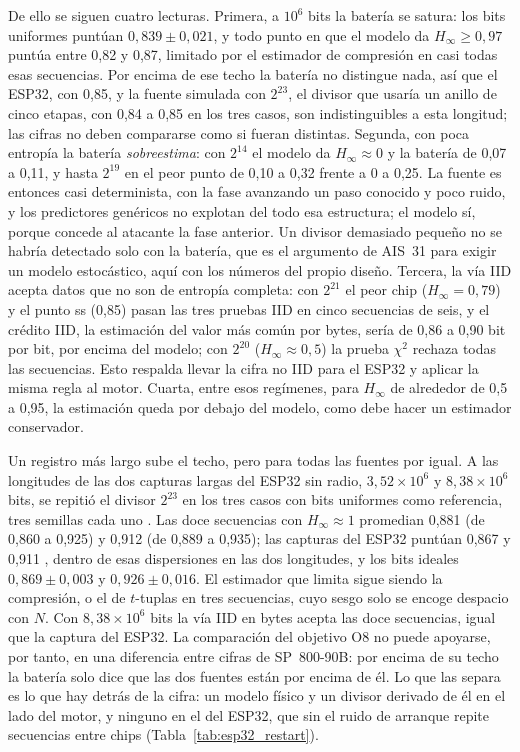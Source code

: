 De ello se siguen cuatro lecturas. Primera, a $10^6$ bits la batería se
satura: los bits uniformes puntúan $0{,}839 \pm 0{,}021$, y todo punto en
que el modelo da $H_\infty \ge 0{,}97$ puntúa entre 0,82 y 0,87, limitado
por el estimador de compresión en casi todas esas secuencias. Por encima de ese techo la
batería no distingue nada, así que el ESP32, con 0,85, y la fuente
simulada con $2^{23}$, el divisor que usaría un anillo de cinco etapas,
con 0,84 a 0,85 en los tres casos, son indistinguibles a esta longitud; las cifras no deben compararse como si
fueran distintas. Segunda, con poca entropía la batería
\emph{sobreestima}: con $2^{14}$ el modelo da $H_\infty \approx 0$ y la
batería de 0,07 a 0,11, y hasta $2^{19}$ en el peor punto de 0,10 a 0,32
frente a 0 a 0,25. La fuente es entonces casi determinista, con la fase
avanzando un paso conocido y poco ruido, y los predictores genéricos no
explotan del todo esa estructura; el modelo sí, porque concede al atacante
la fase anterior. Un divisor demasiado pequeño no se habría detectado solo
con la batería, que es el argumento de AIS~31 para exigir un modelo
estocástico, aquí con los números del propio diseño. Tercera, la vía IID
acepta datos que no son de entropía completa: con $2^{21}$ el peor chip
($H_\infty = 0{,}79$) y el punto ss (0,85) pasan las tres pruebas IID en
cinco secuencias de seis, y el crédito IID, la estimación del valor más
común por bytes, sería de 0,86 a 0,90 bit por bit, por encima del modelo;
con $2^{20}$ ($H_\infty \approx 0{,}5$) la prueba $\chi^2$ rechaza todas
las secuencias. Esto respalda llevar la cifra no IID para el ESP32 y
aplicar la misma regla al motor. Cuarta, entre esos regímenes, para
$H_\infty$ de alrededor de 0,5 a 0,95, la estimación queda por debajo del
modelo, como debe hacer un estimador conservador.

Un registro más largo sube el techo, pero para todas las fuentes por
igual. A las longitudes de las dos capturas largas del ESP32 sin radio,
$3{,}52 \times 10^6$ y $8{,}38 \times 10^6$ bits, se repitió el divisor
$2^{23}$ en los tres casos con bits uniformes como referencia, tres
semillas cada uno \simu{}. Las doce secuencias con $H_\infty \approx 1$
promedian 0,881 (de 0,860 a 0,925) y 0,912 (de 0,889 a 0,935); las
capturas del ESP32 puntúan 0,867 y 0,911 \meas{}, dentro de esas
dispersiones en las dos longitudes, y los bits ideales
$0{,}869 \pm 0{,}003$ y $0{,}926 \pm 0{,}016$. El estimador que limita
sigue siendo la compresión, o el de $t$-tuplas en tres secuencias, cuyo
sesgo solo se encoge despacio con $N$. Con $8{,}38 \times 10^6$ bits la
vía IID en bytes acepta las doce secuencias, igual que la captura del
ESP32. La comparación del objetivo O8 no puede apoyarse, por tanto, en
una diferencia entre cifras de SP~800-90B: por encima de su techo la
batería solo dice que las dos fuentes están por encima de él. Lo que las
separa es lo que hay detrás de la cifra: un modelo físico y un divisor
derivado de él en el lado del motor, y ninguno en el del ESP32, que sin
el ruido de arranque repite secuencias entre chips
(Tabla~\ref{tab:esp32_restart}).

